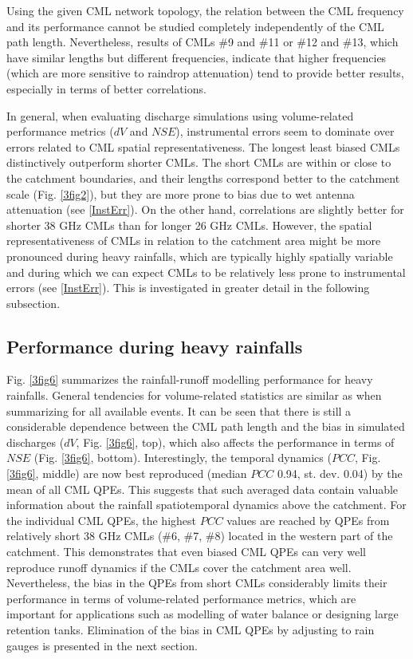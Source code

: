 \documentclass{ctuthesis}\usepackage[]{graphicx}\usepackage[]{color}
\begin{document}
Using the given CML network topology, the relation between the CML frequency and its performance cannot be studied completely independently of the CML path length. Nevertheless, results of CMLs \#9 and \#11 or \#12 and \#13, which have similar lengths but different frequencies, indicate that higher frequencies (which are more sensitive to raindrop attenuation) tend to provide better results, especially in terms of better correlations.
 
In general, when evaluating discharge simulations using volume-related performance metrics ($dV$ and $NSE$), instrumental errors seem to dominate over errors related to CML spatial representativeness. The longest least biased CMLs distinctively outperform shorter CMLs. The short CMLs are within or close to the catchment boundaries, and their lengths correspond better to the catchment scale (Fig. \ref{3fig2}), but they are more prone to bias due to wet antenna attenuation (see \ref{InstErr}). On the other hand, correlations are slightly better for shorter 38 GHz CMLs than for longer 26 GHz CMLs. However, the spatial representativeness of CMLs in relation to the catchment area might be more pronounced during heavy rainfalls, which are typically highly spatially variable and during which we can expect CMLs to be relatively less prone to instrumental errors (see \ref{InstErr}). This is investigated in greater detail in the following subsection.

\subsection{Performance during heavy rainfalls}

Fig. \ref{3fig6} summarizes the rainfall-runoff modelling performance for heavy rainfalls. General tendencies for volume-related statistics are similar as when summarizing for all available events. It can be seen that there is still a considerable dependence between the CML path length and the bias in simulated discharges ($dV$, Fig. \ref{3fig6}, top), which also affects the performance in terms of $NSE$ (Fig. \ref{3fig6}, bottom). Interestingly, the temporal dynamics ($PCC$, Fig. \ref{3fig6}, middle) are now best reproduced (median $PCC$ 0.94, st. dev. 0.04) by the mean of all CML QPEs. This suggests that such averaged data contain valuable information about the rainfall spatiotemporal dynamics above the catchment. For the individual CML QPEs, the highest $PCC$ values are reached by QPEs from relatively short 38 GHz CMLs (\#6, \#7, \#8) located in the western part of the catchment. This demonstrates that even biased CML QPEs can very well reproduce runoff dynamics if the CMLs cover the catchment area well. Nevertheless, the bias in the QPEs from short CMLs considerably limits their performance in terms of volume-related performance metrics, which are important for applications such as modelling of water balance or designing large retention tanks. Elimination of the bias in CML QPEs by adjusting to rain gauges is presented in the next section.
\end{document}
